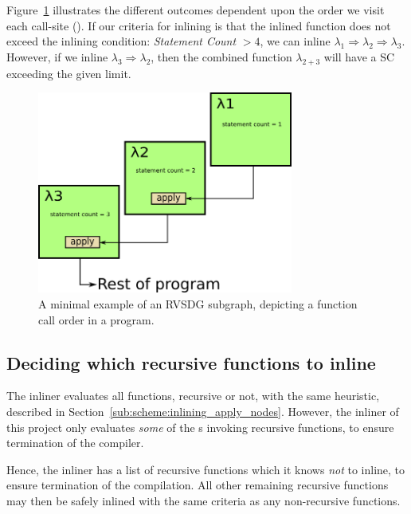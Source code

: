 Figure~\ref{fig:inline_ordering_ex} illustrates the different outcomes dependent
upon the order we visit each call-site (\applyNode ). If our criteria for
inlining is that the inlined function does not exceed the inlining condition:
\textit{Statement Count} $> 4$, we can inline $\lambda_1 \Rightarrow \lambda_2
\Rightarrow \lambda_3$. However, if we inline $\lambda_3 \Rightarrow \lambda_2$,
then the combined function $\lambda_{2+3}$ will have a SC exceeding the given
limit.

\begin{figure}[H]
	\centering
	\includegraphics[width=0.75\textwidth]{figures/inline_ordering_ex}
	\caption{A minimal example of an RVSDG subgraph, depicting a function call
order in a program.}
	\label{fig:inline_ordering_ex}
\end{figure}

\subsection{Deciding which recursive functions to inline}
\label{sub:scheme:inlining_recur_apply_nodes}

The inliner evaluates all functions, recursive or not, with the same heuristic,
described in Section~\ref{sub:scheme:inlining_apply_nodes}. However, the inliner
of this project only evaluates \textit{some} of the \applyNode s invoking
recursive functions, to ensure termination of the compiler.


Hence, the inliner has a list of recursive functions which it knows \textit{not}
to inline, to ensure termination of the compilation. All other remaining
recursive functions may then be safely inlined with the same criteria as any
non-recursive functions.
